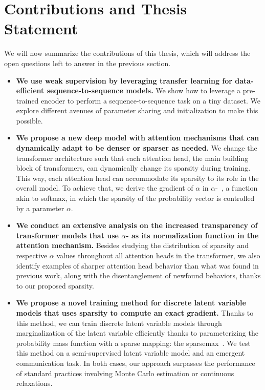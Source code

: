 \section{Contributions and Thesis Statement}
\label{sec:int_contributions}

\noindent We will now summarize the contributions of this thesis, which will
address the open questions left to answer in the previous section.

\begin{itemize}

    \item \textbf{We use weak supervision by leveraging transfer learning
              for data-efficient sequence-to-sequence models.} We show how to
          leverage a pre-trained encoder to perform a
          sequence-to-sequence task on a tiny dataset. We explore different
          avenues of parameter sharing and initialization to make this
          possible.


    \item \textbf{We propose a new deep model with attention mechanisms that can
              dynamically adapt to be denser or sparser as needed.} We change the
          transformer architecture such that each attention head, the main
          building block of transformers, can dynamically change its sparsity
          during training. This way, each attention head can accommodate its
          sparsity to its role in the overall model. To achieve that, we derive
          the gradient of $\alpha$ in $\alpha$-\entmaxtext{}~\citep{entmax}, a
          function akin to softmax, in which the sparsity of the probability
          vector is controlled by a parameter $\alpha$.

    \item \textbf{We conduct an extensive analysis on the increased
              transparency of transformer models that use {\boldmath
                      $\alpha$}-\entmaxtext{} as its normalization function in the
              attention mechanism.}
          Besides studying the distribution of sparsity and respective $\alpha$ values
          throughout all attention heads in the transformer, we also identify
          examples of sharper attention head behavior than what was found in
          previous work, along with the disentanglement of newfound behaviors,
          thanks to our proposed sparsity.

    \item \textbf{We propose a novel training method for discrete latent variable
              models that uses sparsity to compute an
              exact gradient.} Thanks to this method, we can train discrete latent
          variable models through marginalization of the latent variable
          efficiently thanks to parameterizing the probability mass function
          with a sparse mapping: the sparsemax~\citep{sparsemax}. We test this
          method on a semi-supervised latent variable model and an emergent
          communication task. In both cases, our approach surpasses the
          performance of standard practices involving Monte Carlo estimation or
          continuous relaxations.


\end{itemize}
